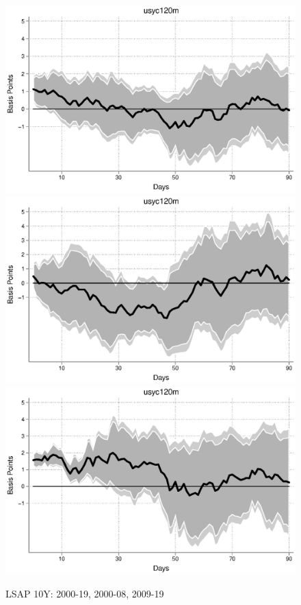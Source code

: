 \documentclass{article}
\begin{document}
\begin{figure}[tbph]
	\begin{center}
		\caption{LSAP 10Y: 2000-19, 2000-08, 2009-19}
		\includegraphics[trim={0cm 0cm 0cm 0cm},clip,height=0.3\textheight,width=1\textwidth]{../LagDep-FX/LSAP/US/usyc120m00-19lsap.eps} \\
		\includegraphics[trim={0cm 0cm 0cm 0cm},clip,height=0.3\textheight,width=1\textwidth]{../LagDep-FX/LSAP/US/usyc120m00-08lsap.eps} \\
		\includegraphics[trim={0cm 0cm 0cm 0cm},clip,height=0.3\textheight,width=1\textwidth]{../LagDep-FX/LSAP/US/usyc120m09-19lsap.eps} \\

\end{center}
\end{figure}
\end{document}
